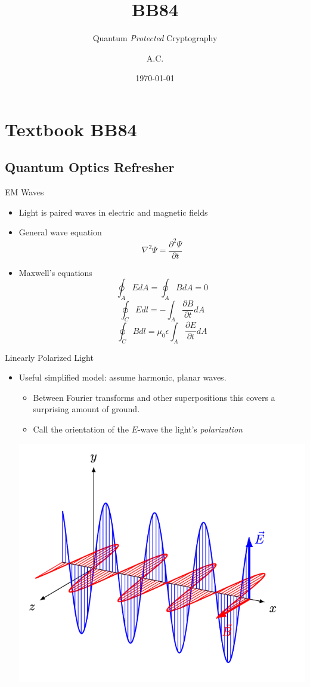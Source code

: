 \documentclass[pdf]{beamer}
\title{BB84}
\subtitle{Quantum \emph{Protected} Cryptography}
\author{A.C.}
\date{\today}
\begin{document}
\begin{frame}
  \titlepage
\end{frame}

\section{Textbook BB84}
\subsection{Quantum Optics Refresher}
\begin{frame}{EM Waves}
  \begin{itemize}
  \item Light is paired waves in electric and magnetic fields
  \pause\item General wave equation \[\nabla^2\Psi = \frac{\partial^2\Psi}{\partial t} \]
  \pause\item Maxwell's equations
    \[ \oint_A E dA = \oint_A B dA = 0 \]
    \[ \oint_C E dl = - \int_A \frac{\partial B}{\partial t} dA\]
    \[ \oint_C B dl = \mu_0 \epsilon \int_A \frac{\partial E}{\partial t} dA \]
  \end{itemize}
\end{frame}
\begin{frame}{Linearly Polarized Light}
  \begin{itemize}
  \item Useful simplified model: assume harmonic, planar waves.
    \begin{itemize}
    \item Between Fourier transforms and other superpositions this covers a
      surprising amount of ground.
    \item Call the orientation of the $E$-wave the light's \emph{polarization}
    \end{itemize}
    \begin{center}
      \includegraphics[scale=0.25]{images/EM-Wave.png}
    \end{center}
  \end{itemize}
\end{frame}
\end{document}
